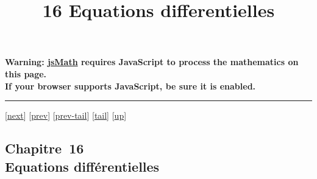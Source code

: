 \documentclass[]{article}
\title{16 Equations differentielles}
\author{}
\date{}
\begin{document}
\maketitle

\textbf{Warning: \href{http://www.math.union.edu/locate/jsMath}{jsMath}
requires JavaScript to process the mathematics on this page.\\ If your
browser supports JavaScript, be sure it is enabled.}

\begin{center}\rule{3in}{0.4pt}\end{center}

{[}\href{coursch18.html}{next}{]} {[}\href{coursch16.html}{prev}{]}
{[}\href{coursch16.html\#tailcoursch16.html}{prev-tail}{]}
{[}\hyperref[tailcoursch17.html]{tail}{]}
{[}\href{cours.html\#coursch17.html}{up}{]}

\subsection{Chapitre~16\\Equations différentielles}
\end{document}
